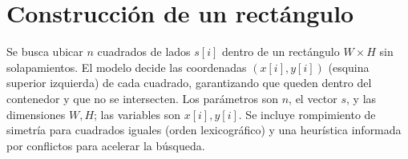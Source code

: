 
\section{Construcción de un rectángulo}\label{sec:06-rectangulo}
Se busca ubicar \(n\) cuadrados de lados \(s[i]\) dentro de un rectángulo \(W\times H\) sin solapamientos. El modelo decide las coordenadas \((x[i],y[i])\) (esquina superior izquierda) de cada cuadrado, garantizando que queden dentro del contenedor y que no se intersecten. Los parámetros son \(n\), el vector \(s\), y las dimensiones \(W,H\); las variables son \(x[i],y[i]\). Se incluye rompimiento de simetría para cuadrados iguales (orden lexicográfico) y una heurística informada por conflictos para acelerar la búsqueda.
